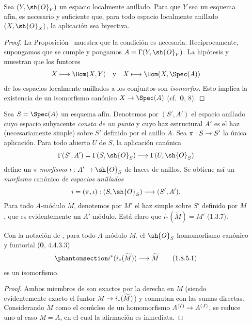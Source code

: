 \documentclass[oneside,10pt]{amsart}
\makeatletter
\newcommand{\ega@arrow}[2]{\mathchoice{#1}{#2}{#2}{#2}}
\renewcommand{\to}{\ega@arrow{\longrightarrow}{\rightarrow}}
\let\EGAOriginalLabel\label
\renewcommand{\label}[1]{\phantomsection\EGAOriginalLabel{#1}}
\makeatother
\begin{document}
\begin{corollary}[1.8.3]
\label{ega2:addendum:I.1.8.3}
Sea $(Y,\sh{O}_Y)$ un espacio localmente anillado. Para que $Y$ sea un
esquema afín, es necesario y suficiente que, para todo espacio
localmente anillado $(X,\sh{O}_X)$, la aplicación \textup{} sea
biyectiva.
\end{corollary}

\begin{proof}
La Proposición~ muestra que la condición es necesaria.
Recíprocamente, supongamos que se cumple y pongamos
$A=\Gamma(Y,\sh{O}_Y)$. La hipótesis y  muestran que los
funtores
\[
  X\longmapsto\Hom(X,Y)
  \quad\hbox{y}\quad
  X\longmapsto\Hom(X,\Spec(A))
\]
de los espacios localmente anillados a los conjuntos son \emph{isomorfos}.
Esto implica la existencia de un isomorfismo canónico
$X\to\Spec(A)$ (cf.~\textbf 0, 8).
\end{proof}

\begin{env}[1.8.4]
\label{ega2:addendum:I.1.8.4}
Sea $S=\Spec(A)$ un esquema afín. Denotemos por $(S',A')$ el espacio
anillado cuyo espacio subyacente \emph{consta de un punto} y cuyo haz
estructural $A'$ es el haz (necesariamente simple) sobre $S'$ definido
por el anillo $A$. Sea $\pi:S\to S'$ la única aplicación. Para todo
abierto $U$ de $S$, la aplicación canónica
\[
  \Gamma(S',A')=\Gamma(S,\sh{O}_S)\to\Gamma(U,\sh{O}_S)
\]
define un \emph{$\pi$-morfismo} $\iota:A'\to\sh{O}_S$ de haces de anillos.
Se obtiene así un \emph{morfismo} canónico \emph{de espacios anillados}
\[
  i=(\pi,\iota):(S,\sh{O}_S)\to(S',A').
\]
Para todo $A$-módulo $M$, denotemos por $M'$ el haz simple sobre $S'$
definido por $M$, que es evidentemente un $A'$-módulo. Está claro que
$i_*(\widetilde M)=M'$ (1.3.7).
\end{env}

\begin{lemma}[1.8.5]
\label{ega2:addendum:I.1.8.5}
Con la notación de \textup{}, para todo $A$-módulo $M$, el
$\sh{O}_S$-homomorfismo canónico y funtorial \textup{(\textbf{0}, 4.4.3.3)}
\begin{equation}
\label{ega2:addendum:I.1.8.5.1}
  i^*(i_*(\widetilde M))\to\widetilde M
\tag{1.8.5.1}
\end{equation}
es un isomorfismo.
\end{lemma}

\begin{proof}
Ambos miembros de  son exactos por la derecha en $M$
(siendo evidentemente exacto el funtor
$M\to i_*(\widetilde M)$) y conmutan con las sumas directas.
Considerando $M$ como el conúcleo de un homomorfismo
$A^{(I)}\to A^{(J)}$, se reduce uno al caso $M=A$, en el cual la
afirmación es inmediata.
\end{proof}
\end{document}
